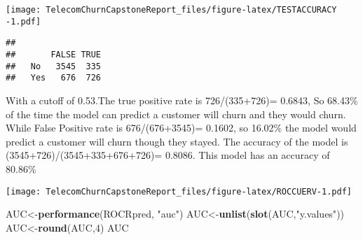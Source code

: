\documentclass[]{article}
\newenvironment{Shaded}{\begin{snugshade}}{\end{snugshade}}
\newcommand{\KeywordTok}[1]{\textcolor[rgb]{0.13,0.29,0.53}{\textbf{#1}}}
\newcommand{\DataTypeTok}[1]{\textcolor[rgb]{0.13,0.29,0.53}{#1}}
\newcommand{\DecValTok}[1]{\textcolor[rgb]{0.00,0.00,0.81}{#1}}
\newcommand{\FloatTok}[1]{\textcolor[rgb]{0.00,0.00,0.81}{#1}}
\newcommand{\StringTok}[1]{\textcolor[rgb]{0.31,0.60,0.02}{#1}}
\newcommand{\CommentTok}[1]{\textcolor[rgb]{0.56,0.35,0.01}{\textit{#1}}}
\newcommand{\OtherTok}[1]{\textcolor[rgb]{0.56,0.35,0.01}{#1}}
\newcommand{\OperatorTok}[1]{\textcolor[rgb]{0.81,0.36,0.00}{\textbf{#1}}}
\newcommand{\NormalTok}[1]{#1}
\begin{document}
\texttt{[image: TelecomChurnCapstoneReport\_files/figure-latex/TESTACCURACY -1.pdf]}

\begin{Shaded}
\end{Shaded}

\begin{verbatim}
##      
##       FALSE TRUE
##   No   3545  335
##   Yes   676  726
\end{verbatim}

With a cutoff of 0.53.The true positive rate is 726/(335+726)= 0.6843,
So 68.43\% of the time the model can predict a customer will churn and
they would churn. While False Positive rate is 676/(676+3545)= 0.1602,
so 16.02\% the model would predict a customer will churn though they
stayed. The accuracy of the model is (3545+726)/(3545+335+676+726)=
0.8086. This model has an accuracy of 80.86\%

\begin{Shaded}
\end{Shaded}

\texttt{[image: TelecomChurnCapstoneReport\_files/figure-latex/ROCCUERV-1.pdf]}

\begin{Shaded}
\begin{Highlighting}[]
\NormalTok{AUC<-}\KeywordTok{performance}\NormalTok{(ROCRpred, }\StringTok{"auc"}\NormalTok{)}
\NormalTok{AUC<-}\KeywordTok{unlist}\NormalTok{(}\KeywordTok{slot}\NormalTok{(AUC,}\StringTok{"y.values"}\NormalTok{))}
\NormalTok{AUC<-}\KeywordTok{round}\NormalTok{(AUC,}\DecValTok{4}\NormalTok{)}
\NormalTok{AUC}
\end{Highlighting}
\end{Shaded}
\end{document}
